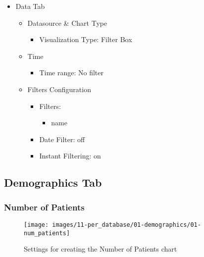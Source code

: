 \documentclass[
]{book}
\providecommand{\tightlist}{%
  \setlength{\itemsep}{0pt}\setlength{\parskip}{0pt}}
\begin{document}
\begin{itemize}
\tightlist
\item
  Data Tab

  \begin{itemize}
  \tightlist
  \item
    Datasource \& Chart Type

    \begin{itemize}
    \tightlist
    \item
      Visualization Type: Filter Box
    \end{itemize}
  \item
    Time

    \begin{itemize}
    \tightlist
    \item
      Time range: No filter
    \end{itemize}
  \item
    Filters Configuration

    \begin{itemize}
    \tightlist
    \item
      Filters:

      \begin{itemize}
      \tightlist
      \item
        name
      \end{itemize}
    \item
      Date Filter: off
    \item
      Instant Filtering: on
    \end{itemize}
  \end{itemize}
\end{itemize}

\hypertarget{demographics-tab}{%
\subsection*{Demographics Tab}\label{demographics-tab}}

\hypertarget{number-of-patients}{%
\subsubsection*{Number of Patients}\label{number-of-patients}}

\begin{figure}
\texttt{[image: images/11-per\_database/01-demographics/01-num\_patients]} \caption{Settings for creating the Number of Patients chart}\label{fig:numPatients}
\end{figure}
\end{document}

